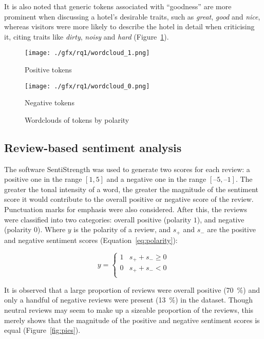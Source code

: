 \documentclass[12pt, a4paper]{pancake-article}
\begin{document}
It is also noted that generic tokens associated with ``goodness'' are more
prominent when discussing a hotel's desirable traits, such as \textit{great},
\textit{good} and \textit{nice}, whereas visitors were more likely to
describe the hotel in detail when criticising it, citing traits like
\textit{dirty}, \textit{noisy} and \textit{hard} (Figure~\ref{fig:wordclouds}).

\begin{figure}[htpb]
	\centering
	\begin{minipage}{0.5\textwidth}
		\centering
		\texttt{[image: ./gfx/rq1/wordcloud\_1.png]}
		\caption*{Positive tokens}
	\end{minipage}\hfill
	\begin{minipage}{0.5\textwidth}
		\centering
		\texttt{[image: ./gfx/rq1/wordcloud\_0.png]}
		\caption*{Negative tokens}
	\end{minipage}
	\caption{Wordclouds of tokens by polarity}
	\label{fig:wordclouds}
\end{figure}

\subsection{Review-based sentiment analysis}\label{sec:reviews}

The software SentiStrength was used to generate two scores for each review:
a positive one in the range \(\left[1, 5\right]\) and a negative one in the range \(\left[–5, –1\right]\).
The greater the tonal intensity of a word, the greater the magnitude of the sentiment score
it would contribute to the overall positive or negative score of the review. Punctuation marks for
emphasis were also considered. After this, the reviews were classified into two categories: overall
positive (polarity \(1\)), and negative (polarity \(0\)). Where \(y\) is the polarity
of a review, and \(s_+\) and \(s_-\) are the positive and negative sentiment scores (Equation~\ref{eq:polarity}):

\begin{equation}
	y = \begin{cases}
		1 & s_+ + s_- \geq 0 \\
		0 & s_+ + s_- < 0    \\
	\end{cases}
	\label{eq:polarity}
\end{equation}

It is observed that a large proportion of reviews were overall positive (\qty{70}{\percent})
and only a handful of negative reviews were present (\qty{13}{\percent}) in the dataset.
Though neutral reviews may seem to make up a sizeable proportion of the reviews, this merely
shows that the magnitude of the positive and negative sentiment scores is equal (Figure~\ref{fig:pies}).
\end{document}
